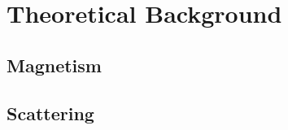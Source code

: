 \documentclass[\main/dresen_thesis.tex]{subfiles}
\begin{document}
\chapter{Theoretical Background}\label{ch:theoreticalBackground}

\section{Magnetism}

\section{Scattering}
\end{document}
